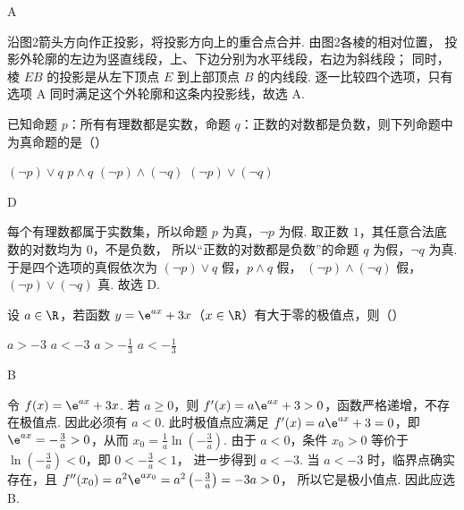 \begin{answer}
A
\end{answer}

\begin{solution}
沿图2箭头方向作正投影，将投影方向上的重合点合并. 由图2各棱的相对位置，
投影外轮廓的左边为竖直线段，上、下边分别为水平线段，右边为斜线段；
同时，棱 \(EB\) 的投影是从左下顶点 \(E\) 到上部顶点 \(B\) 的内线段.
逐一比较四个选项，只有选项 A 同时满足这个外轮廓和这条内投影线，故选 A.
\end{solution}

\begin{problem}
已知命题 \(p\)：所有有理数都是实数，命题 \(q\)：正数的对数都是负数，则下列命题中为真命题的是（\quad）

\choices
    {\((\neg p) \lor q\)}
    {\(p \wedge q\)}
    {\((\neg p) \wedge (\neg q)\)}
    {\((\neg p) \lor (\neg q)\)}
\end{problem}

\begin{answer}
D
\end{answer}

\begin{solution}
每个有理数都属于实数集，所以命题 \(p\) 为真，\(\neg p\) 为假.
取正数 \(1\)，其任意合法底数的对数均为 \(0\)，不是负数，
所以“正数的对数都是负数”的命题 \(q\) 为假，\(\neg q\) 为真.
于是四个选项的真假依次为
\((\neg p)\lor q\) 假，\(p\wedge q\) 假，
\((\neg p)\wedge(\neg q)\) 假，\((\neg p)\lor(\neg q)\) 真.
故选 D.
\end{solution}

\begin{problem}
设 \(a \in \R\)，若函数 \(y = \e^{ax} + 3x\)（\(x \in \R\)）有大于零的极值点，则（\quad）

\choices
    {\(a > -3\)}
    {\(a < -3\)}
    {\(a > -\frac{1}{3}\)}
    {\(a < -\frac{1}{3}\)}
\end{problem}

\begin{answer}
B
\end{answer}

\begin{solution}
令 \(f(x)=\e^{ax}+3x\). 若 \(a\geqslant0\)，则
\(f'(x)=a\e^{ax}+3>0\)，函数严格递增，不存在极值点.
因此必须有 \(a<0\). 此时极值点应满足
\(f'(x)=a\e^{ax}+3=0\)，即
\(\e^{ax}=-\frac{3}{a}>0\)，从而
\(x_0=\frac{1}{a}\ln\left(-\frac{3}{a}\right)\).
由于 \(a<0\)，条件 \(x_0>0\) 等价于
\(\ln\left(-\frac{3}{a}\right)<0\)，即 \(0<-\frac{3}{a}<1\)，
进一步得到 \(a<-3\).
当 \(a<-3\) 时，临界点确实存在，且
\(f''(x_0)=a^2\e^{ax_0}=a^2\left(-\frac{3}{a}\right)=-3a>0\)，
所以它是极小值点. 因此应选 B.
\end{solution}

